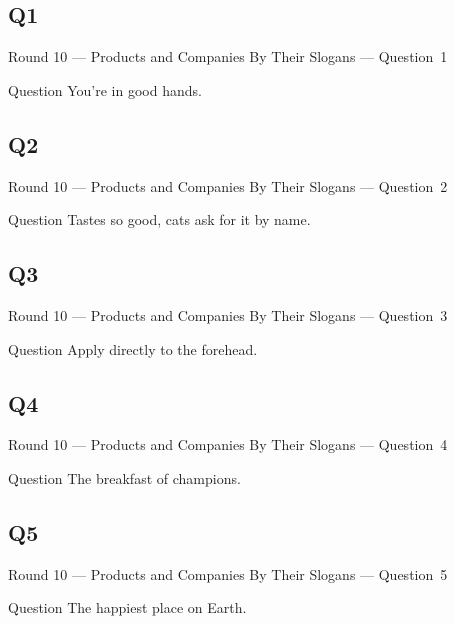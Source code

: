 \documentclass[11pt]{beamer}
\begin{document}
\subsection*{Q1}
\begin{frame}[t]{Round 10 --- Products and Companies By Their Slogans --- \mbox{Question 1}}
\begin{block}{Question}
You're in good hands.
\end{block}
\end{frame}
\subsection*{Q2}
\begin{frame}[t]{Round 10 --- Products and Companies By Their Slogans --- \mbox{Question 2}}
\begin{block}{Question}
Tastes so good, cats ask for it by name.
\end{block}
\end{frame}
\subsection*{Q3}
\begin{frame}[t]{Round 10 --- Products and Companies By Their Slogans --- \mbox{Question 3}}
\begin{block}{Question}
Apply directly to the forehead.
\end{block}
\end{frame}
\subsection*{Q4}
\begin{frame}[t]{Round 10 --- Products and Companies By Their Slogans --- \mbox{Question 4}}
\begin{block}{Question}
The breakfast of champions.
\end{block}
\end{frame}
\subsection*{Q5}
\begin{frame}[t]{Round 10 --- Products and Companies By Their Slogans --- \mbox{Question 5}}
\begin{block}{Question}
The happiest place on Earth.
\end{block}
\end{frame}
\end{document}
